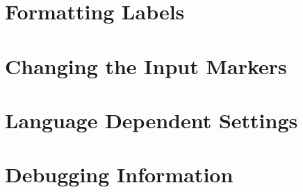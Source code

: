 \documentclass[load-preamble+,babel-options={english,american}]{cnltx-doc}
\begin{document}
\section{Formatting Labels}\label{sec:formatting-labels}

\section{Changing the Input Markers}\label{sec:chang-input-mark}

\section{Language Dependent Settings}\label{sec:lang-depend-sett}

\section{Debugging Information}\label{sec:debugg-inform}
\end{document}
